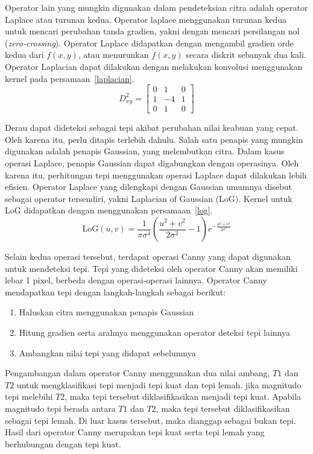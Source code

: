\documentclass[conference, a4paper]{IEEEtran}
\begin{document}
Operator lain yang mungkin digunakan dalam pendeteksian citra adalah operator Laplace atau turunan kedua. Operator laplace menggunakan turunan kedua untuk mencari perubahan tanda gradien, yakni dengan mencari persilangan nol (\textit{zero-crossing}). Operator Laplace didapatkan dengan mengambil gradien orde kedua dari $f(x,y)$, atau menurunkan $f(x,y)$ secara diskrit sebanyak dua kali. Operator Laplacian dapat dilakukan dengan melakukan konvolusi menggunakan kernel pada persamaan~\ref{laplacian}.
\begin{equation}
  D^2_{xy} = \left [\begin{matrix}
      0 & 1  & 0 \\
      1 & -4 & 1 \\
      0 & 1  & 0
    \end{matrix}\right ]
  \label{laplacian}
\end{equation}

Derau dapat dideteksi sebagai tepi akibat perubahan nilai keabuan yang cepat. Oleh karena itu, perlu ditapis terlebih dahulu. Salah satu penapis yang mungkin digunakan adalah penapis Gaussian, yang melembutkan citra. Dalam kasus operasi Laplace, penapis Gaussian dapat digabungkan dengan operasinya. Oleh karena itu, perhitungan tepi menggunakan operasi Laplace dapat dilakukan lebih efisien. Operator Laplace yang dilengkapi dengan Gaussian umumnya disebut sebagai operator tersendiri, yakni Laplacian of Gaussian (LoG). Kernel untuk LoG didapatkan dengan menggunakan persamaan~\ref{log}.
\begin{equation}
  \mathrm{LoG}(u, v) = \frac{1}{\pi \sigma^4}
  \left(\frac{u^2 + v^2}{2\sigma^2} - 1\right)
  e^{-\frac{u^2+v^2}{2\sigma^2}}
  \label{log}
\end{equation}

Selain kedua operasi tersebut, terdapat operasi Canny yang dapat digunakan untuk mendeteksi tepi. Tepi yang dideteksi oleh operator Canny akan memiliki lebar 1 pixel, berbeda dengan operasi-operasi lainnya. Operator Canny mendapatkan tepi dengan langkah-langkah sebagai berikut:
\begin{enumerate}
  \item Haluskan citra menggunakan penapis Gaussian
  \item Hitung gradien serta arahnya menggunakan operator deteksi tepi lainnya
  \item Ambangkan nilai tepi yang didapat sebelumnya
\end{enumerate}

Pengambangan dalam operator Canny menggunakan dua nilai ambang, $T1$ dan $T2$ untuk mengklasifikasi tepi menjadi tepi kuat dan tepi lemah. jika magnitudo tepi melebihi $T2$, maka tepi tersebut diklasifikasikan menjadi tepi kuat. Apabila magnitudo tepi berada antara $T1$ dan $T2$, maka tepi tersebut diklasifikasikan sebagai tepi lemah. Di luar kasus tersebut, maka dianggap sebagai bukan tepi. Hasil dari operator Canny merupakan tepi kuat serta tepi lemah yang berhubungan dengan tepi kuat.
\end{document}
